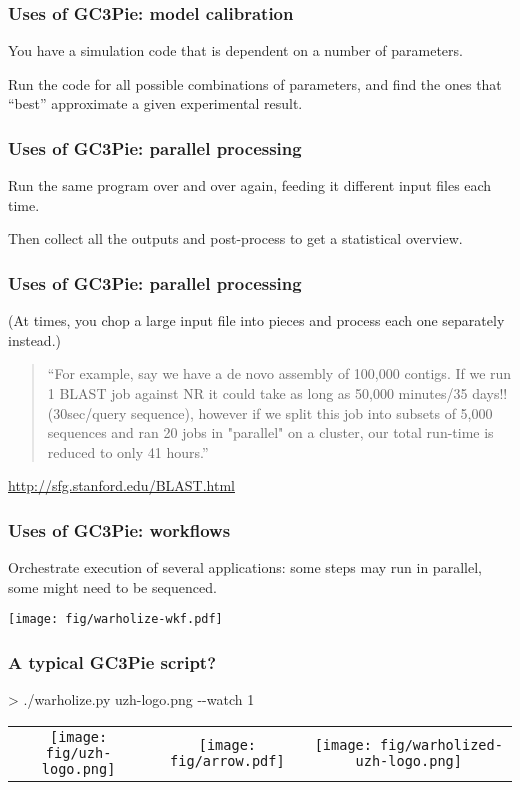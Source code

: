 \documentclass[english,serif,mathserif,usenames,dvipsnames]{beamer}
\begin{document}
\begin{frame}[fragile]
  \frametitle{Uses of GC3Pie: model calibration}

  You have a simulation code that is dependent on a number of parameters.

  \+
  Run the code for all possible combinations of parameters, and
  find the ones that ``best'' approximate a given experimental result.
\end{frame}


\begin{frame}[fragile]
  \frametitle{Uses of GC3Pie: parallel processing}

  Run the same program over and over again,
  feeding it different input files each time.

  \+
  Then collect all the outputs and post-process to get a
  statistical overview.
\end{frame}


\begin{frame}[fragile]
  \frametitle{Uses of GC3Pie: parallel processing}
  (At times, you chop a large input file into pieces and process each one separately instead.)

  \+
  \begin{quote}
    ``For example, say we have a de novo assembly of 100,000
    contigs. If we run 1 BLAST job against NR it could take as long as
    50,000 minutes/35 days!! (30sec/query sequence), however if we
    split this job into subsets of 5,000 sequences and ran 20 jobs in
    "parallel" on a cluster, our total run-time is reduced to only 41
    hours.''
  \end{quote}
  \begin{references}
    \url{http://sfg.stanford.edu/BLAST.html}
  \end{references}
\end{frame}


\begin{frame}
  \frametitle{Uses of GC3Pie: workflows}

  \begin{center}
    Orchestrate execution of several applications:
    some steps may run in parallel, some might need to be sequenced.

    \+
    \texttt{[image: fig/warholize-wkf.pdf]}
  \end{center}
\end{frame}


\begin{frame}
  \frametitle{A typical GC3Pie script?}

\begin{semiverbatim}
    > ./warholize.py uzh-logo.png -{}-watch 1
\end{semiverbatim}

  \begin{tabular}[c]{ccc}
    \texttt{[image: fig/uzh-logo.png]}
    &
    \texttt{[image: fig/arrow.pdf]}
    &
    \texttt{[image: fig/warholized-uzh-logo.png]}
  \end{tabular}
\end{frame}
\end{document}
